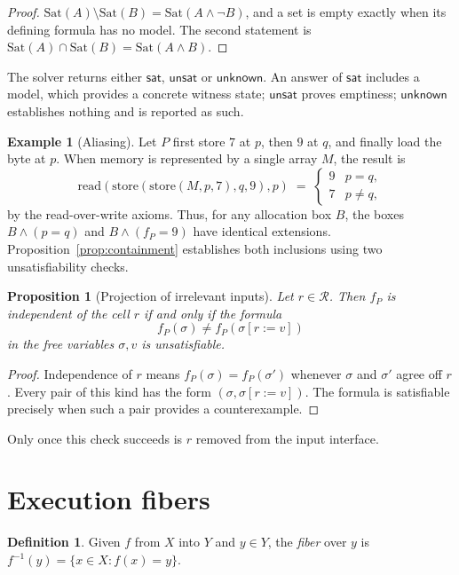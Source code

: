 \documentclass[11pt]{article}
\newtheorem{proposition}[theorem]{Proposition}
\theoremstyle{definition}
\newtheorem{definition}[theorem]{Definition}
\newtheorem{example}[theorem]{Example}
\theoremstyle{remark}
\newcommand{\Sat}{\mathrm{Sat}}
\begin{document}
\begin{proof}
$\Sat(A) \setminus \Sat(B) = \Sat(A \wedge \neg B)$, and a set is empty exactly when its defining formula has no model. The second statement is $\Sat(A) \cap \Sat(B) = \Sat(A \wedge B)$.
\end{proof}

The solver returns either $\mathsf{sat}$, $\mathsf{unsat}$ or $\mathsf{unknown}$. An answer of $\mathsf{sat}$ includes a model, which provides a concrete witness state; $\mathsf{unsat}$ proves emptiness; $\mathsf{unknown}$ establishes nothing and is reported as such.

\begin{example}[Aliasing]
Let $P$ first store $7$ at $p$, then $9$ at $q$, and finally load the byte at $p$. When memory is represented by a single array $M$, the result is
\[
  \mathrm{read}(\mathrm{store}(\mathrm{store}(M,p,7),q,9),p) \;=\;
  \begin{cases} 9 & p = q, \\ 7 & p \neq q, \end{cases}
\]
by the read-over-write axioms. Thus, for any allocation box $B$, the boxes $B \wedge (p=q)$ and $B \wedge (f_P = 9)$ have identical extensions. Proposition~\ref{prop:containment} establishes both inclusions using two unsatisfiability checks.
\end{example}

\begin{proposition}[Projection of irrelevant inputs]
Let $r \in \mathcal{R}$. Then $f_P$ is independent of the cell $r$ if and only if the formula
\[
  f_P(\sigma) \neq f_P(\sigma[r := v])
\]
in the free variables $\sigma, v$ is unsatisfiable.
\end{proposition}

\begin{proof}
Independence of $r$ means $f_P(\sigma) = f_P(\sigma')$ whenever $\sigma$ and $\sigma'$ agree off $r$. Every pair of this kind has the form $(\sigma, \sigma[r:=v])$. The formula is satisfiable precisely when such a pair provides a counterexample.
\end{proof}

Only once this check succeeds is $r$ removed from the input interface.

\section{Execution fibers}

\begin{definition}
Given $f$ from $X$ into $Y$ and $y \in Y$, the \emph{fiber} over $y$ is $f^{-1}(y) = \{x \in X : f(x) = y\}$.
\end{definition}
\end{document}
